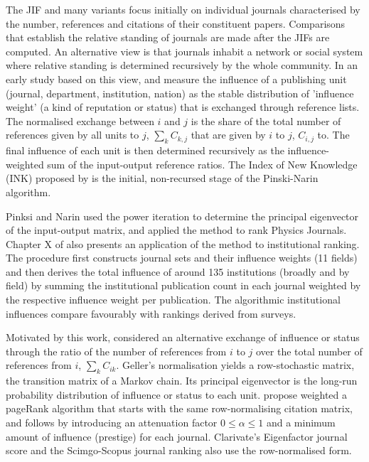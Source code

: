 \documentclass[10pt]{article}
\begin{document}
The JIF and many variants focus initially on individual journals characterised by the number, references and citations of their constituent papers. Comparisons that establish the relative standing of journals are made after the JIFs are computed. An alternative view is that journals inhabit a network or social system where relative standing is determined recursively by the whole community. In an early study based on this view, \cite{narinEVALUATIVEBIBLIOMETRICSUSE1976} and \cite{pinski} measure the influence of a publishing unit (journal, department, institution, nation) as the stable distribution of 'influence weight' (a kind of reputation or status) that is exchanged through reference lists. The normalised exchange between $i$ and $j$ is the share of the total number of references given by all units to $j$, $\sum_k C_{k,j}$ that are given by $i$ to $j$, $C_{i,j}$ to. The final influence of each unit is then determined recursively as the influence-weighted sum of the input-output reference ratios. The Index of New Knowledge (INK) proposed by \cite{paulyReinterpretation145influenceWeight1462008} is the initial, non-recursed stage of the Pinski-Narin algorithm.

Pinksi and Narin used the power iteration to determine the principal eigenvector of the input-output matrix, and applied the method to rank Physics Journals. Chapter X of \cite{narinEVALUATIVEBIBLIOMETRICSUSE1976} also presents an application of the method to institutional ranking. The procedure first constructs journal sets and their influence weights (11 fields) and then derives the total influence of around 135 institutions (broadly and by field) by summing the institutional publication count in each journal weighted by the respective influence weight per publication. The algorithmic institutional influences compare favourably with rankings derived from surveys.

Motivated by this work, \cite{gellerCitationInfluenceMethodology1978} considered an alternative exchange of influence or status through the ratio of the number of references from $i$ to $j$ over the total number of references from $i$, $\sum_k C_{ik}$. Geller's normalisation yields a row-stochastic matrix, the transition matrix of a Markov chain. Its principal eigenvector is the long-run probability distribution of influence or status to each unit. \cite{bollenJournalStatus2006a} propose weighted a pageRank algorithm that starts with the same row-normalising citation matrix, and follows \cite{pageMethodNodeRanking1998} by introducing an attenuation factor $0 \le \alpha \le 1$ and a minimum amount of influence (prestige) for each journal. Clarivate's Eigenfactor journal score \citep{bergstromEigenfactorMeasuringValue2007, westEigenfactorMetricsNetwork2010} and the Scimgo-Scopus journal ranking \citep{gonzalez-pereiraNewApproachMetric2010,guerrero-boteFurtherStepForward2012} also use the row-normalised form. 
\end{document}
